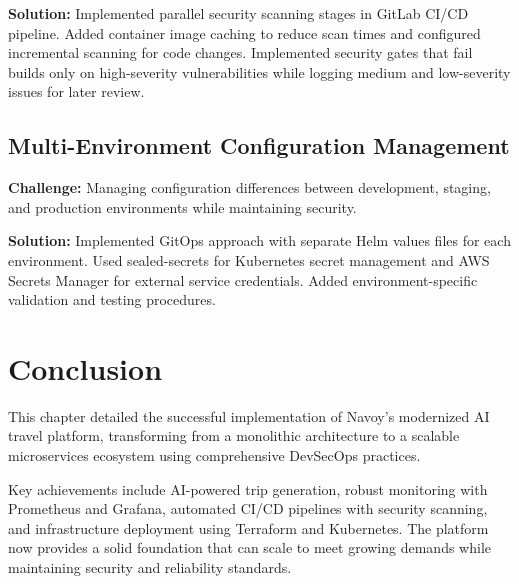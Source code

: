 \textbf{Solution:} Implemented parallel security scanning stages in GitLab CI/CD pipeline. Added container image caching to reduce scan times and configured incremental scanning for code changes. Implemented security gates that fail builds only on high-severity vulnerabilities while logging medium and low-severity issues for later review.

\subsection{Multi-Environment Configuration Management}
\textbf{Challenge:} Managing configuration differences between development, staging, and production environments while maintaining security.

\textbf{Solution:} Implemented GitOps approach with separate Helm values files for each environment. Used sealed-secrets for Kubernetes secret management and AWS Secrets Manager for external service credentials. Added environment-specific validation and testing procedures.

\setcounter{secnumdepth}{0} %
\section{Conclusion}
This chapter detailed the successful implementation of Navoy's modernized AI travel platform, transforming from a monolithic architecture to a scalable microservices ecosystem using comprehensive DevSecOps practices.

Key achievements include AI-powered trip generation, robust monitoring with Prometheus and Grafana, automated CI/CD pipelines with security scanning, and infrastructure deployment using Terraform and Kubernetes. The platform now provides a solid foundation that can scale to meet growing demands while maintaining security and reliability standards.
